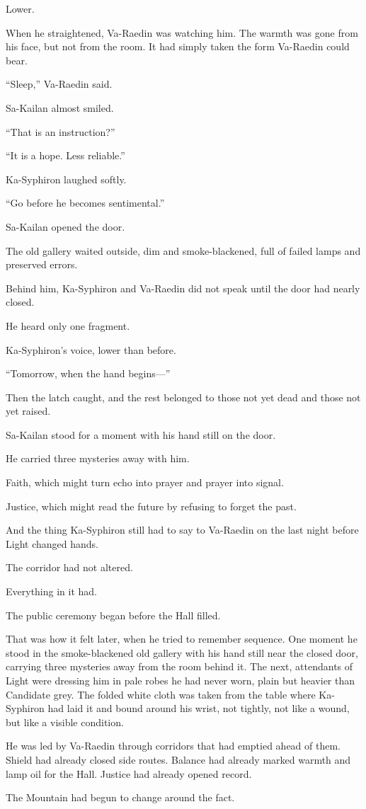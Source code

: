 Lower.\par
When he straightened, Va-Raedin was watching him. The warmth was gone from his face, but not from the room. It had simply taken the form Va-Raedin could bear.\par
“Sleep,” Va-Raedin said.\par
Sa-Kailan almost smiled.\par
“That is an instruction?”\par
“It is a hope. Less reliable.”\par
Ka-Syphiron laughed softly.\par
“Go before he becomes sentimental.”\par
Sa-Kailan opened the door.\par
The old gallery waited outside, dim and smoke-blackened, full of failed lamps and preserved errors.\par
Behind him, Ka-Syphiron and Va-Raedin did not speak until the door had nearly closed.\par
He heard only one fragment.\par
Ka-Syphiron’s voice, lower than before.\par
“Tomorrow, when the hand begins—”\par
Then the latch caught, and the rest belonged to those not yet dead and those not yet raised.\par
Sa-Kailan stood for a moment with his hand still on the door.\par
He carried three mysteries away with him.\par
Faith, which might turn echo into prayer and prayer into signal.\par
Justice, which might read the future by refusing to forget the past.\par
And the thing Ka-Syphiron still had to say to Va-Raedin on the last night before Light changed hands.\par
The corridor had not altered.\par
Everything in it had.\par
The public ceremony began before the Hall filled.\par
That was how it felt later, when he tried to remember sequence. One moment he stood in the smoke-blackened old gallery with his hand still near the closed door, carrying three mysteries away from the room behind it. The next, attendants of Light were dressing him in pale robes he had never worn, plain but heavier than Candidate grey. The folded white cloth was taken from the table where Ka-Syphiron had laid it and bound around his wrist, not tightly, not like a wound, but like a visible condition.\par
He was led by Va-Raedin through corridors that had emptied ahead of them. Shield had already closed side routes. Balance had already marked warmth and lamp oil for the Hall. Justice had already opened record.\par
The Mountain had begun to change around the fact.\par

